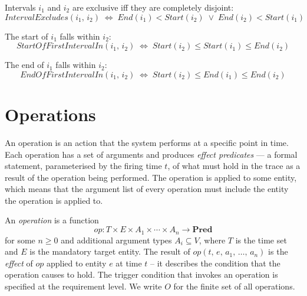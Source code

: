 \begin{definition}\label{def:pred_excludes}
    Intervals $i_1$ and $i_2$ are exclusive iff they are completely disjoint:
    \[
        \mathit{IntervalExcludes}(i_1,\, i_2) \;\Leftrightarrow\;
        \mathit{End}(i_1) < \mathit{Start}(i_2) \;\lor\; \mathit{End}(i_2) < \mathit{Start}(i_1)
    \]
\end{definition}

\begin{definition}\label{def:pred_start_in}
    The start of $i_1$ falls within $i_2$:
    \[
        \mathit{StartOfFirstIntervalIn}(i_1,\, i_2) \;\Leftrightarrow\;
        \mathit{Start}(i_2) \leq \mathit{Start}(i_1) \leq \mathit{End}(i_2)
    \]
\end{definition}

\begin{definition}\label{def:pred_end_in}
    The end of $i_1$ falls within $i_2$:
    \[
        \mathit{EndOfFirstIntervalIn}(i_1,\, i_2) \;\Leftrightarrow\;
        \mathit{Start}(i_2) \leq \mathit{End}(i_1) \leq \mathit{End}(i_2)
    \]
\end{definition}

\section{Operations}\label{sec:operations}

An operation is an action that the system performs at a specific point in time.
Each operation has a set of arguments and produces \emph{effect predicates} — a formal statement, parameterised by the firing time $t$, of what must hold in the trace as a result of the operation being performed.
The operation is applied to some entity, which means that the argument list of every operation must include the entity the operation is applied to.

\begin{definition}[Operation]\label{def:operation}
    An \emph{operation} is a function
    \[
        op : T \times E \times A_1 \times \cdots \times A_n \rightarrow \mathbf{Pred}
    \]
    for some $n \geq 0$ and additional argument types $A_i \subseteq V$, where $T$ is the time set and $E$ is the mandatory target entity.
    The result of $op(t,\, e,\, a_1,\, \ldots,\, a_n)$ is the \emph{effect} of $op$ applied to entity $e$ at time $t$ -- it describes the condition that the operation causes to hold.
    The trigger condition that invokes an operation is specified at the requirement level.
    We write $O$ for the finite set of all operations.
\end{definition}

